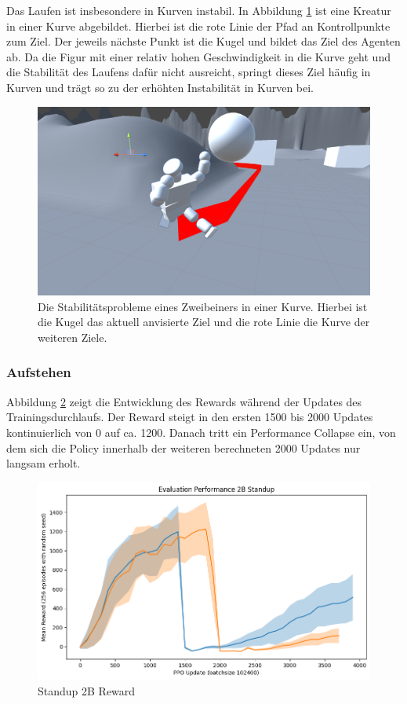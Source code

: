 Das Laufen ist insbesondere in Kurven instabil. In Abbildung \ref{fig:2bKurve} ist eine Kreatur in einer Kurve abgebildet. Hierbei ist die rote Linie der Pfad an Kontrollpunkte zum Ziel. Der jeweils nächste Punkt ist die Kugel und bildet das Ziel des Agenten ab. Da die Figur mit einer relativ hohen Geschwindigkeit in die Kurve geht und die Stabilität des Laufens dafür nicht ausreicht, springt dieses Ziel häufig in Kurven und trägt so zu der erhöhten Instabilität in Kurven bei.

\begin{figure}
	\centering
	\includegraphics[width=0.7\linewidth]{resources/img/Unity_id9Hnh5u8N}
	\caption[Zweibeiner in einer Kurve]{Die Stabilitätsprobleme eines Zweibeiners in einer Kurve. Hierbei ist die Kugel das aktuell anvisierte Ziel und die rote Linie die Kurve der weiteren Ziele.}
	\label{fig:2bKurve}
\end{figure}

\subsubsection{Aufstehen}

Abbildung \ref{fig:Standup2B_Reward} zeigt die Entwicklung des Rewards während der Updates des Trainingsdurchlaufs. Der Reward steigt in den ersten 1500 bis 2000 Updates kontinuierlich von 0 auf ca. 1200. Danach tritt ein Performance Collapse ein, von dem sich die Policy innerhalb der weiteren berechneten 2000 Updates nur langsam erholt.


\begin{figure}[ht]
    \centering
    \includegraphics[width=0.5\linewidth]{resources/img/results/Standup2B_Reward.png}
    \caption{Standup 2B Reward}\label{fig:Standup2B_Reward}
\end{figure}

